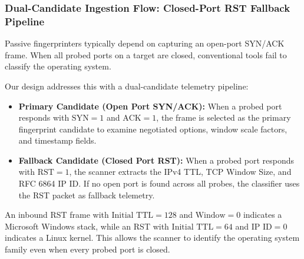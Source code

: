 \documentclass[11pt,a4paper]{article}
\begin{document}
\subsubsection{Dual-Candidate Ingestion Flow: Closed-Port RST Fallback Pipeline}
Passive fingerprinters typically depend on capturing an open-port SYN/ACK frame. When all probed ports on a target are closed, conventional tools fail to classify the operating system.

Our design addresses this with a dual-candidate telemetry pipeline:
\begin{itemize}[nosep, leftmargin=1.4em]
    \item \textbf{Primary Candidate (Open Port SYN/ACK):} When a probed port responds with $\text{SYN}=1$ and $\text{ACK}=1$, the frame is selected as the primary fingerprint candidate to examine negotiated options, window scale factors, and timestamp fields.
    \item \textbf{Fallback Candidate (Closed Port RST):} When a probed port responds with $\text{RST}=1$, the scanner extracts the IPv4 TTL, TCP Window Size, and RFC 6864 IP ID. If no open port is found across all probes, the classifier uses the RST packet as fallback telemetry.
\end{itemize}
An inbound RST frame with $\text{Initial TTL} = 128$ and $\text{Window} = 0$ indicates a Microsoft Windows stack, while an RST with $\text{Initial TTL} = 64$ and $\text{IP ID} = 0$ indicates a Linux kernel. This allows the scanner to identify the operating system family even when every probed port is closed.
\end{document}
